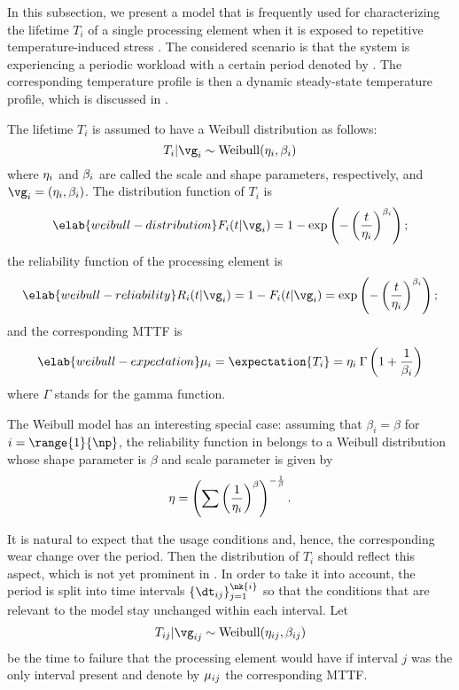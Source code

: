 In this subsection, we present a model that is frequently used for
characterizing the lifetime $T_i$ of a single processing element when it is
exposed to repetitive temperature-induced stress \cite{huang2009b, xiang2010}.
The considered scenario is that the system is experiencing a periodic workload
with a certain period denoted by \period. The corresponding temperature profile
is then a dynamic steady-state temperature profile, which is discussed in
.

The lifetime $T_i$ is assumed to have a Weibull distribution as follows:
\[
  T_i | \vg_i \sim \mathrm{Weibull}(\scale_i, \shape_i)
\]
where $\eta_i$ and $\beta_i$ are called the scale and shape parameters,
respectively, and $\vg_i = (\scale_i, \shape_i)$. The distribution function of
$T_i$ is
\begin{equation} \elab{weibull-distribution}
  F_i(t | \vg_i) = 1 - \exp\left(-\left(\frac{t}{\scale_i}\right)^{\shape_i}\right);
\end{equation}
the reliability function of the processing element is
\begin{equation} \elab{weibull-reliability}
  R_i(t | \vg_i) = 1 - F_i(t | \vg_i) = \exp\left(-\left(\frac{t}{\scale_i}\right)^{\shape_i}\right);
\end{equation}
and the corresponding \ac{MTTF} is
\begin{equation} \elab{weibull-expectation}
  \mean_i = \expectation{T_i} = \scale_i \: \Gamma\left(1 + \frac{1}{\shape_i}\right)
\end{equation}
where $\Gamma$ stands for the gamma function.

\begin{remark} 
The Weibull model has an interesting special case: assuming that $\beta_i =
\beta$ for $i = \range{1}{\np}$, the reliability function in
 belongs to a Weibull distribution whose shape parameter
is $\beta$ and scale parameter is given by
\[
  \eta = \left(\sum\left(\frac{1}{\eta_i}\right)^\beta\right)^{-\frac{1}{\beta}}.
\]
\end{remark}

It is natural to expect that the usage conditions and, hence, the corresponding
wear change over the period. Then the distribution of $T_i$ should reflect this
aspect, which is not yet prominent in . In order to
take it into account, the period is split into  time intervals $\{
\dt_{ij} \}_{j = 1}^{\nk{i}}$ so that the conditions that are relevant to the
model stay unchanged within each interval. Let
\[
  T_{ij} | \vg_{ij} \sim \mathrm{Weibull}(\scale_{ij}, \shape_{ij})
\]
be the time to failure that the processing element would have if interval $j$
was the only interval present and denote by $\mu_{ij}$ the corresponding
\ac{MTTF}.

